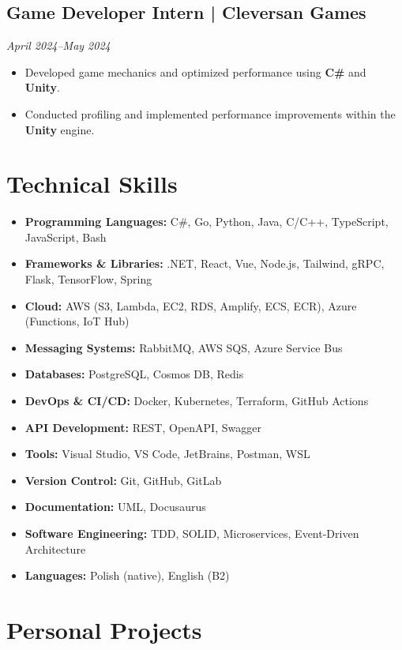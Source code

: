 \documentclass[a4paper,10pt]{article}
\begin{document}
\subsection{Game Developer Intern | Cleversan Games}
\textit{April 2024--May 2024}
\begin{itemize}[leftmargin=0.5cm, nosep]
    \item Developed game mechanics and optimized performance using \textbf{C\#} and \textbf{Unity}.
    \item Conducted profiling and implemented performance improvements within the \textbf{Unity} engine.
\end{itemize}

\section{Technical Skills}
\begin{itemize}[leftmargin=0.5cm, itemsep=6pt, label=\textbullet]
    \item \textbf{Programming Languages:} C\#, Go, Python, Java, C/C++, TypeScript, JavaScript, Bash
    \item \textbf{Frameworks \& Libraries:} .NET, React, Vue, Node.js, Tailwind, gRPC, Flask, TensorFlow, Spring
    \item \textbf{Cloud:} AWS (S3, Lambda, EC2, RDS, Amplify, ECS, ECR), Azure (Functions, IoT Hub)
    \item \textbf{Messaging Systems:} RabbitMQ, AWS SQS, Azure Service Bus
    \item \textbf{Databases:} PostgreSQL, Cosmos DB, Redis
    \item \textbf{DevOps \& CI/CD:} Docker, Kubernetes, Terraform, GitHub Actions
    \item \textbf{API Development:} REST, OpenAPI, Swagger
    \item \textbf{Tools:} Visual Studio, VS Code, JetBrains, Postman, WSL
    \item \textbf{Version Control:} Git, GitHub, GitLab
    \item \textbf{Documentation:} UML, Docusaurus
    \item \textbf{Software Engineering:} TDD, SOLID, Microservices, Event-Driven Architecture
    \item \textbf{Languages:} Polish (native), English (B2)
\end{itemize}

\section{Personal Projects}
\end{document}
